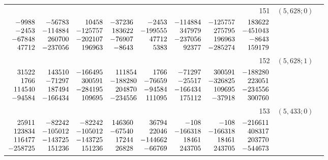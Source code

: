\documentclass[11pt]{article}
\theoremstyle{remark}
\numberwithin{equation}{section}
\begin{document}
\begin{longtable}{rcl}
151 & $(5,628;0)$ & \begin{tabular}[t]{@{}l@{}}$w_i=\displaystyle \frac{1782004166473368917}{2452672546374861552000000000000000000}$\\[3pt]{\scriptsize$\begin{array}{@{}rrrrrrrr@{}}-9988 & -56783 & 10458 & -37236 & -2453 & -114884 & -125757 & 183622\\-2453 & -114884 & -125757 & 183622 & -199555 & 347979 & 275795 & -451043\\-67848 & 260700 & -202107 & -76907 & 47712 & -237056 & 196963 & -8643\\47712 & -237056 & 196963 & -8643 & 5383 & 92377 & -285274 & 159179\end{array}$}\end{tabular}\\[8pt]
152 & $(5,628;1)$ & \begin{tabular}[t]{@{}l@{}}$w_i=\displaystyle \frac{46769778056333567}{70169300037843706875000000000000000}$\\[3pt]{\scriptsize$\begin{array}{@{}rrrrrrrr@{}}31522 & 143510 & -166495 & 111854 & 1766 & -71297 & 300591 & -188280\\1766 & -71297 & 300591 & -188280 & -76659 & -25517 & -326825 & 223051\\114540 & 187494 & -284195 & 204870 & -94584 & -166434 & 109695 & -234556\\-94584 & -166434 & 109695 & -234556 & 111095 & 175112 & -37918 & 300760\end{array}$}\end{tabular}\\[8pt]
153 & $(5,433;0)$ & \begin{tabular}[t]{@{}l@{}}$w_i=\displaystyle \frac{2755766554090241463}{27643309784734467430400000000000000000}$\\[3pt]{\scriptsize$\begin{array}{@{}rrrrrrrr@{}}25911 & -82242 & -82242 & 146360 & 36794 & -108 & -108 & -216611\\123834 & -105012 & -105012 & -67540 & 22046 & -166318 & -166318 & 408317\\116477 & -143725 & -143725 & 17244 & -144662 & 18461 & 18461 & 203770\\-258725 & 151236 & 151236 & 26828 & -66769 & 243705 & 243705 & -544673\end{array}$}\end{tabular}\\[8pt]

\end{longtable}
\end{document}
